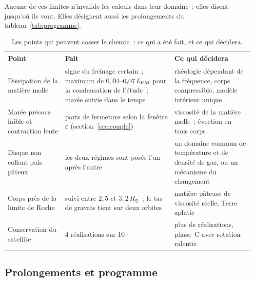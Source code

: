 \documentclass[11pt,a4paper]{article}
\newcommand{\Rt}{\ensuremath{R_\oplus}}
\newcommand{\LEM}{\ensuremath{L_{\rm EM}}}
\begin{document}
Aucune de ces limites n'invalide les calculs dans leur domaine~; elles disent jusqu'où ils vont. Elles désignent aussi les prolongements du tableau~\ref{tab:programme}.

\begin{table}[htbp]
\centering
\caption{Les points qui peuvent casser le chemin~: ce qui a été fait, et ce qui décidera.\label{tab:faille}}
\small
\begin{tabular}{>{\raggedright\arraybackslash}p{3.2cm}>{\raggedright\arraybackslash}p{5.6cm}>{\raggedright\arraybackslash}p{5.8cm}}
\toprule
Point & Fait & Ce qui décidera \\
\midrule
Dissipation de la matière molle & signe du freinage certain~; maximum de $0{,}04$--$0{,}07\,\LEM$ pour la condensation de l'étude~; marée suivie dans le temps & rhéologie dépendant de la fréquence, corps compressible, modèle intérieur unique \\
Marée précoce faible et contraction lente & parts de fermeture selon la fenêtre $\varepsilon$ (section~\ref{sec:couple}) & viscosité de la matière molle~; évection en trois corps \\
Disque non collant puis pâteux & les deux régimes sont posés l'un après l'autre & un domaine commun de température et de densité de gaz, ou un mécanisme du changement \\
Corps près de la limite de Roche & suivi entre $2{,}5$ et $3{,}2\,\Rt$~; le tas de gravats tient sur deux orbites & matière pâteuse de viscosité réelle, Terre aplatie \\
Conservation du satellite & $4$ réalisations sur $10$ & plus de réalisations, phase~C avec rotation ralentie \\
\bottomrule
\end{tabular}
\end{table}

\subsection{Prolongements et programme}
\end{document}
